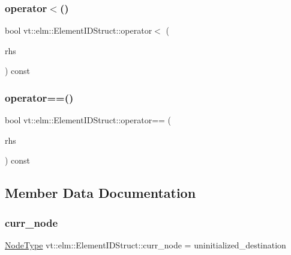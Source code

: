 \subsubsection{\texorpdfstring{operator$<$()}{operator<()}}
{\footnotesize\ttfamily bool vt\+::elm\+::\+Element\+I\+D\+Struct\+::operator$<$ (\begin{DoxyParamCaption}\item[{const \hyperlink{structvt_1_1elm_1_1_element_i_d_struct}{Element\+I\+D\+Struct} \&}]{rhs }\end{DoxyParamCaption}) const\hspace{0.3cm}{\ttfamily [inline]}}

\mbox{\label{structvt_1_1elm_1_1_element_i_d_struct_a98ec58a85fd3e6e809417e17b915b9f5}} 
\subsubsection{\texorpdfstring{operator==()}{operator==()}}
{\footnotesize\ttfamily bool vt\+::elm\+::\+Element\+I\+D\+Struct\+::operator== (\begin{DoxyParamCaption}\item[{const \hyperlink{structvt_1_1elm_1_1_element_i_d_struct}{Element\+I\+D\+Struct} \&}]{rhs }\end{DoxyParamCaption}) const\hspace{0.3cm}{\ttfamily [inline]}}



\subsection{Member Data Documentation}
\mbox{\label{structvt_1_1elm_1_1_element_i_d_struct_af0916244e9dbfe1c746e68b5fb1b5421}} 
\subsubsection{\texorpdfstring{curr\+\_\+node}{curr\_node}}
{\footnotesize\ttfamily \hyperlink{namespacevt_a866da9d0efc19c0a1ce79e9e492f47e2}{Node\+Type} vt\+::elm\+::\+Element\+I\+D\+Struct\+::curr\+\_\+node = uninitialized\+\_\+destination}

